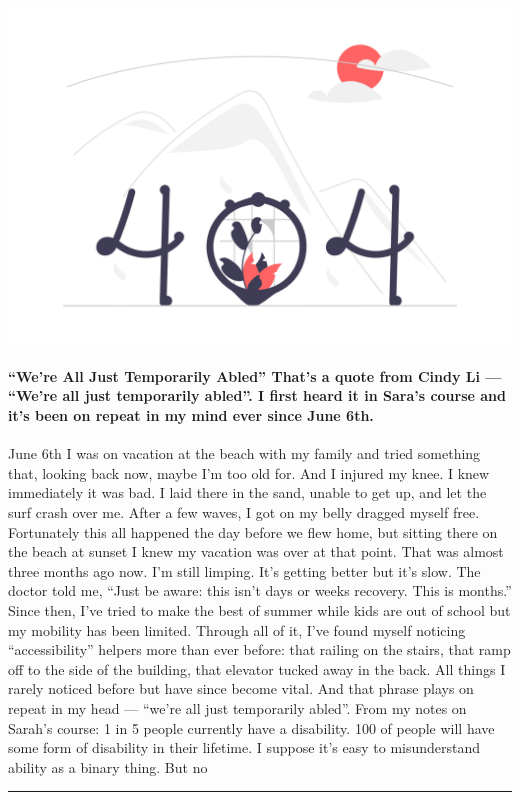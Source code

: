 \documentclass[10pt,a4paper]{article}
\begin{document}
\begin{minipage}[t]{0.80\linewidth}
\vspace{0pt}
\begin{multicols}{2}

    \href{https://blog.jim-nielsen.com/2023/temporarily-abled/?utm\_source=hackernewsletter\&utm\_medium=email\&utm\_term=fav}{
        \includegraphics[width=0.99\linewidth]{notfound.png}
    }
  
\paragraph{“We’re All Just Temporarily Abled”
That’s a quote from Cindy Li — “We're all just temporarily abled”. I first heard it in Sara’s course and it’s been on repeat in my mind ever since June 6th.}

June 6th I was on vacation at the beach with my family and tried something that, looking back now, maybe I’m too old for. And I injured my knee.
I knew immediately it was bad.
I laid there in the sand, unable to get up, and let the surf crash over me. After a few waves, I got on my belly dragged myself free.
Fortunately this all happened the day before we flew home, but sitting there on the beach at sunset I knew my vacation was over at that point.
That was almost three months ago now. I’m still limping. It’s getting better but it’s slow. The doctor told me, “Just be aware: this isn’t days or weeks recovery. This is months.”
Since then, I’ve tried to make the best of summer while kids are out of school but my mobility has been limited.
Through all of it, I’ve found myself noticing “accessibility” helpers more than ever before: that railing on the stairs, that ramp off to the side of the building, that elevator tucked away in the back.
All things I rarely noticed before but have since become vital.
And that phrase plays on repeat in my head — “we’re all just temporarily abled”. From my notes on Sarah’s course:
1 in 5 people currently have a disability. 100 of people will have some form of disability in their lifetime.
I suppose it’s easy to misunderstand ability as a binary thing. But no

\end{multicols}
\end{minipage}
\par\medskip
\noindent\textcolor{red}{\rule{\linewidth}{0.2mm}}
\end{document}
